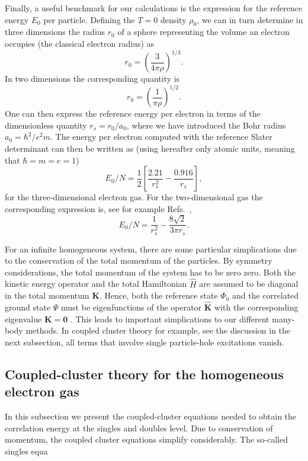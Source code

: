 \documentclass[aps,twocolumn,showpacs,floatfix,nofootinbib,preprintnumbers,superscriptaddress,amsmath,amssymb]{revtex4-1}
\begin{document}
Finally, a useful benchmark for our calculations is the expression for
the reference energy $E_0$ per particle.
Defining the $T=0$ density $\rho_0$, we can in turn determine in three
dimensions the radius $r_0$ of a sphere representing the volume an
electron occupies (the classical electron radius) as
\[
r_0= \left(\frac{3}{4\pi \rho}\right)^{1/3}.
\]
In two dimensions the corresponding quantity is
\[
r_0= \left(\frac{1}{\pi \rho}\right)^{1/2}.
\]
One can then express the reference energy per electron in terms of the
dimensionless quantity $r_s=r_0/a_0$, where we have introduced the
Bohr radius $a_0=\hbar^2/e^2m$. The energy per electron computed with
the reference Slater determinant can then be written as \cite{fetter}
(using hereafter only atomic units, meaning that $\hbar = m = e = 1$)
\[
E_0/N=\frac{1}{2}\left[\frac{2.21}{r_s^2}-\frac{0.916}{r_s}\right],
\]
for the three-dimensional electron gas.  For the two-dimensional gas
the corresponding expression is, see for example
Refs.~\cite{rajagopal1977,tanatar1989},
\[
E_0/N=\frac{1}{r_s^2}-\frac{8\sqrt{2}}{3\pi r_s}.
\]

For an infinite homogeneous system, there are some particular
simplications due to the conservation of the total momentum of the
particles.  By symmetry considerations, the total momentum of the
system has to be zero zero. Both the kinetic energy operator and the
total Hamiltonian $\hat{H}$ are assumed to be diagonal in the total
momentum $\mathbf{K}$. Hence, both the reference state $\Phi_{0}$ and
the correlated ground state $\Psi$ must be eigenfunctions of the
operator $\mathbf{\hat{K}}$ with the corresponding eigenvalue
$\mathbf{K} = \mathbf{0}$ \cite{day1967}.  This leads to important
simplications to our different many-body methods. In coupled cluster
theory for example, see the discussion in the next subsection, all
terms that involve single particle-hole excitations vanish. 

\subsection{Coupled-cluster theory for the homogeneous electron gas}


In this subsection we present the coupled-cluster equations needed to
obtain the correlation energy at the singles and doubles level. Due to
conservation of momentum, the coupled cluster equations simplify
considerably.  The so-called singles equa
\end{document}
